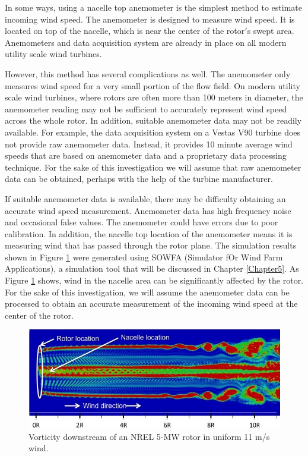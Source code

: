 In some ways, using a nacelle top anemometer is the simplest method to estimate incoming wind speed. The anemometer is designed to measure wind speed. It is located on top of the nacelle, which is near the center of the rotor$'$s swept area. Anemometers and data acquisition system are already in place on all modern utility scale wind turbines. 

However, this method has several complications as well. The anemometer only measures wind speed for a very small portion of the flow field. On modern utility scale wind turbines, where rotors are often more than 100 meters in diameter, the anemometer reading may not be sufficient to accurately represent wind speed across the whole rotor. In addition, suitable anemometer data may not be readily available. For example, the data acquisition system on a Vestas V90 turbine does not provide raw anemometer data. Instead, it provides 10 minute average wind speeds that are based on anemometer data and a proprietary data processing technique. For the sake of this investigation we will assume that raw anemometer data can be obtained, perhaps with the help of the turbine manufacturer.

If suitable anemometer data is available, there may be difficulty obtaining an accurate wind speed measurement. Anemometer data  has high frequency noise and occasional false values. The anemometer could have errors due to poor calibration. In addition, the nacelle top location of the anemometer means it is measuring wind that has passed through the rotor plane. The simulation results shown in Figure \ref{fig2-3} were generated using SOWFA (Simulator fOr Wind Farm Applications), a simulation tool that will be discussed in Chapter \ref{Chapter5}. As Figure \ref{fig2-3} shows, wind in the nacelle area can be significantly affected by the rotor. For the sake of this investigation, we will assume the anemometer data can be processed to obtain an accurate measurement of the incoming wind speed at the center of the rotor.



\begin{figure}[htbp]
	\centering
		\includegraphics[width = \linewidth]{Figures/ch2Figures/fig2-3.jpg}
		
	\caption{Vorticity downstream of an NREL 5-MW rotor in uniform 11 m/s wind.}
	\label{fig2-3}
\end{figure}





